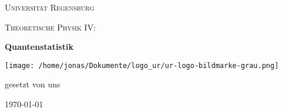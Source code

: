 \begin{titlepage}
  \centering
  {\scshape \LARGE Universität Regensburg \par}
  \vspace{1cm}
  {\scshape\Large Theoretische Physik IV: \par}
  \vspace{1.5cm}
  {\huge\bfseries Quantenstatistik \par}
  \vspace{2cm}
  \texttt{[image: /home/jonas/Dokumente/logo\_ur/ur-logo-bildmarke-grau.png]}\par
  \vfill
  {\large gesetzt von uns\par}
  \vfill
  {\large \today\par}
\end{titlepage}

